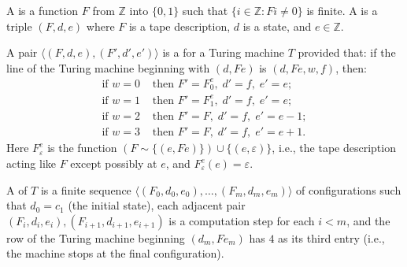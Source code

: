 A  is a function $F$ from $\mathbb{Z}$ into $\{0, 1\}$ such that $\{i \in \mathbb{Z} : Fi \neq 0\}$ is finite. A  is a triple $(F, d, e)$ where $F$ is a tape description, $d$ is a state, and $e \in \mathbb{Z}$.

A pair $\langle (F, d, e), (F', d', e') \rangle$ is a  for a Turing machine $T$ provided that: if the line of the Turing machine beginning with $(d, Fe)$ is $(d, Fe, w, f)$, then:
\begin{align*}
\text{if } w = 0 &\text{ then } F' = F_0^e,\; d' = f,\; e' = e; \\
\text{if } w = 1 &\text{ then } F' = F_1^e,\; d' = f,\; e' = e; \\
\text{if } w = 2 &\text{ then } F' = F,\; d' = f,\; e' = e - 1; \\
\text{if } w = 3 &\text{ then } F' = F,\; d' = f,\; e' = e + 1.
\end{align*}
Here $F_{\varepsilon}^e$ is the function $(F \sim \{(e, Fe)\}) \cup \{(e, \varepsilon)\}$, i.e., the tape description acting like $F$ except possibly at $e$, and $F_{\varepsilon}^e(e) = \varepsilon$.

A  of $T$ is a finite sequence $\langle (F_0, d_0, e_0), \ldots, (F_m, d_m, e_m) \rangle$ of configurations such that $d_0 = c_1$ (the initial state), each adjacent pair $(F_i, d_i, e_i), (F_{i+1}, d_{i+1}, e_{i+1})$ is a computation step for each $i < m$, and the row of the Turing machine beginning $(d_m, Fe_m)$ has $4$ as its third entry (i.e., the machine stops at the final configuration).
